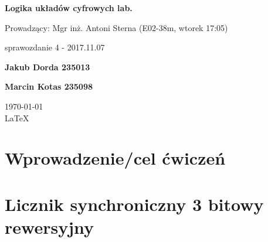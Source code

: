 \documentclass[12pt,a4paper]{article}
\begin{document}
	
	\begin{titlepage}
		
		\centering
		{\huge\bfseries Logika układów cyfrowych lab.\par}
		
		\vspace{0.5cm}
		Prowadzący: Mgr inż. Antoni Sterna (E02-38m, wtorek 17:05) \\
	
		\vspace{1.1cm}
		{\Large sprawozdanie 4 - 2017.11.07\par}
		\vfill
		
		{\large\bfseries Jakub Dorda 235013\par}
		{\large\bfseries Marcin Kotas 235098\par}
		
		\vspace{1cm}
		\today \\ \LaTeX
		
		\restoregeometry
	\end{titlepage}

	
	\section{Wprowadzenie/cel ćwiczeń}
	
	
		
	\section{Licznik synchroniczny 3 bitowy rewersyjny}
		
\end{document}
